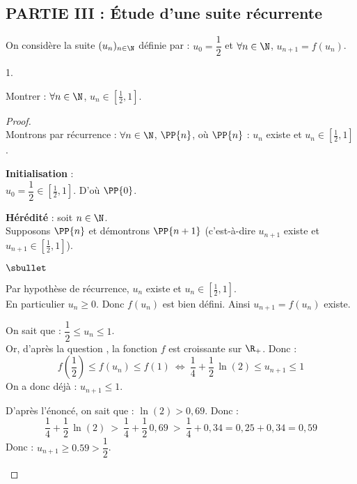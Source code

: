 \documentclass[11pt]{article}%
\begin{document}
\subsection*{PARTIE III : Étude d'une suite récurrente}

\noindent
On considère la suite $(u_n)_{n\in \N}$ définie par : $u_0 =
\dfrac{1}{2}$ \quad et \quad $\forall n\in \N$, $u_{n+1} = f(u_n)$.

\begin{noliste}{1.}
\setlength{\itemsep}{2mm}
\setcounter{enumi}{8}
\item Montrer : $\forall n\in \N$, $u_n \in \left[\frac{1}{2},
    1\right]$.

  \begin{proof}~\\
    Montrons par récurrence : $\forall n\in\N$, $\PP{n}$, \quad où
    \quad $\PP{n}$ : $u_n$ existe et $u_n\in
    \left[\frac{1}{2},1\right]$.
    \begin{noliste}{\fitem}
    \item {\bf Initialisation} : \\
      $u_0=\dfrac{1}{2} \in \left[\frac{1}{2}, 1\right]$. D'où
      $\PP{0}$.
      
    \item {\bf Hérédité} : soit $n\in\N$.\\
      Supposons $\PP{n}$ et démontrons $\PP{n+1}$ (c'est-à-dire
      $u_{n+1}$ existe et $u_{n+1}\in \left[\frac{1}{2},1\right]$).
 \begin{noliste}{$\sbullet$}
 \item Par hypothèse de récurrence, $u_n$ existe et $u_n\in \left[
 \frac{1}{2},1\right]$.\\
 En particulier $u_n\geq 0$. Donc $f(u_n)$ est bien défini. 
 Ainsi $u_{n+1}=f(u_n)$ existe.
 
 \item On sait que : $\dfrac{1}{2} \leq u_n \leq 1$.\\
 Or, d'après la question , la fonction $f$ est croissante
 sur $\R_+$. 
 Donc :
 \[
  f\left(\dfrac{1}{2}\right) \leq f(u_n) \leq f(1) \ 
  \Leftrightarrow \ 
  \dfrac{1}{4} + \dfrac{1}{2}\, \ln(2) \leq u_{n+1} \leq 1
 \]
 On a donc déjà : $u_{n+1} \leq 1$.
 
 \item D'après l'énoncé, on sait que : $\ln(2)>0,69$. Donc :
 \[
  \dfrac{1}{4} + \dfrac{1}{2} \, \ln(2) \ > \ \dfrac{1}{4} + 
  \dfrac{1}{2} \, 0,69 \ > \ \dfrac{1}{4} + 0,34 = 0,25+0,34 = 0,59
 \]
 Donc : $u_{n+1} \geq 0.59 > \dfrac{1}{2}$.
 \end{noliste}
 

\end{noliste}
\end{proof}
\end{noliste}
\end{document}
